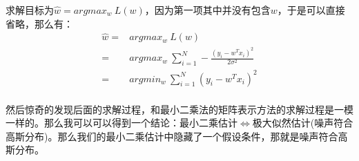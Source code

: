 \documentclass[a4paper]{article}
\begin{document}
求解目标为$\hat{w} = argmax_w \ L(w)$，因为第一项其中并没有包含$w$，于是可以直接省略，那么有：
\begin{align}
    \hat{w} = & argmax_w \ L(w) \\ 
    \nonumber = & argmax_w \ \sum_{i=1}^{N}-\frac{(y_i - w^Tx_i)^2}{2\sigma^2} \\
    \nonumber = & argmin_w \ \sum_{i=1}^{N} (y_i - w^Tx_i)^2 \\
\end{align}

然后惊奇的发现后面的求解过程，和最小二乘法的矩阵表示方法的求解过程是一模一样的。那么我可以可以得到一个结论：最小二乘估计$\Longleftrightarrow$极大似然估计(噪声符合高斯分布)。那么我们的最小二乘估计中隐藏了一个假设条件，那就是噪声符合高斯分布。
\end{document}
